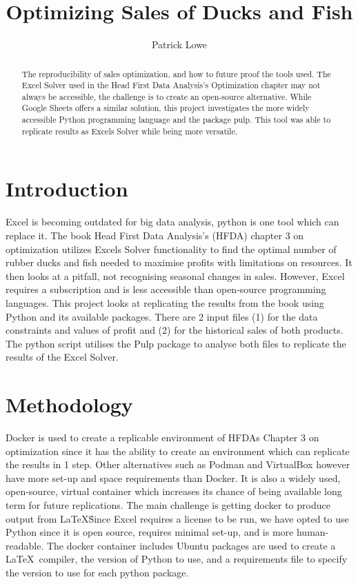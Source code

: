 \documentclass[acmtog]{acmart}
\begin{document}
\title{Optimizing Sales of Ducks and Fish}
\author{Patrick Lowe}

\begin{abstract}
The reproducibility of sales optimization, and how to future proof the tools used. The Excel Solver used in the Head First Data Analysis's Optimization chapter may not always be accessible, the challenge is to create an open-source alternative. While Google Sheets offers a similar solution, this project investigates the more widely accessible Python programming language and the package pulp. This tool was able to replicate results as Excels Solver while being more versatile.
\end{abstract}

\maketitle

\section{Introduction}
Excel is becoming outdated for big data analysis, python is one tool which can replace it. The book Head First Data Analysis's (HFDA) chapter 3 on optimization utilizes Excels Solver functionality to find the optimal number of rubber ducks and fish needed to maximise profits with limitations on resources. It then looks at a pitfall, not recognising seasonal changes in sales. However, Excel requires a subscription and is less accessible than open-source programming languages. This project looks at replicating the results from the book using Python and its available packages. There are 2 input files (1) for the data constraints and values of profit and (2) for the historical sales of both products. The python script utilises the Pulp package to analyse both files to replicate the results of the Excel Solver. 

\section{Methodology}
Docker is used to create a replicable environment of HFDAs Chapter 3 on optimization since it has the ability to create an environment which can replicate the results in 1 step. Other alternatives such as Podman and VirtualBox however have more set-up and space requirements than Docker. It is also a widely used, open-source, virtual container which increases its chance of being available long term for future replications. The main challenge is getting docker to produce output from \LaTeX\. Since Excel requires a license to be run, we have opted to use Python since it is open source, requires minimal set-up, and is more human-readable. The docker container includes Ubuntu packages are used to create a \LaTeX\ compiler, the version of Python to use, and a requirements file to specify the version to use for each python package.
\end{document}
